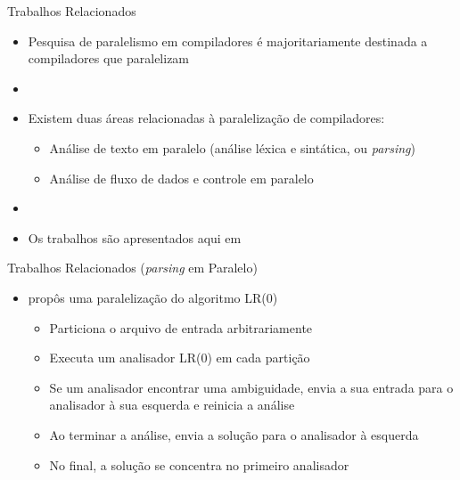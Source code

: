 \begin{frame}{Trabalhos Relacionados}
    \begin{itemize}
        \item Pesquisa de paralelismo em compiladores é majoritariamente destinada a compiladores que paralelizam
        \item[]
        \item Existem duas áreas relacionadas à paralelização de compiladores:
        \begin{itemize}
            \item Análise de texto em paralelo (análise léxica e sintática, ou \textit{parsing})
            \item Análise de fluxo de dados e controle em paralelo
        \end{itemize}
        \item[]
        \item Os trabalhos são apresentados aqui em {\color{blue}{ordem cronológica}}
    \end{itemize}
\end{frame}

\begin{frame}{Trabalhos Relacionados (\textit{parsing} em Paralelo)}
    \begin{itemize}
        \item \cite{Mickunas:1978:PCM:800127.804105} propôs uma paralelização do algoritmo LR(0)
            \begin{itemize}
                \item Particiona o arquivo de entrada arbitrariamente
                \item Executa um analisador LR(0) em cada partição
                \item Se um analisador encontrar uma ambiguidade, envia a sua entrada para o analisador à sua esquerda e reinicia a análise
                \item Ao terminar a análise, envia a solução para o analisador à esquerda
                \item No final, a solução se concentra no primeiro analisador
            \end{itemize}
    \end{itemize}
\end{frame}

